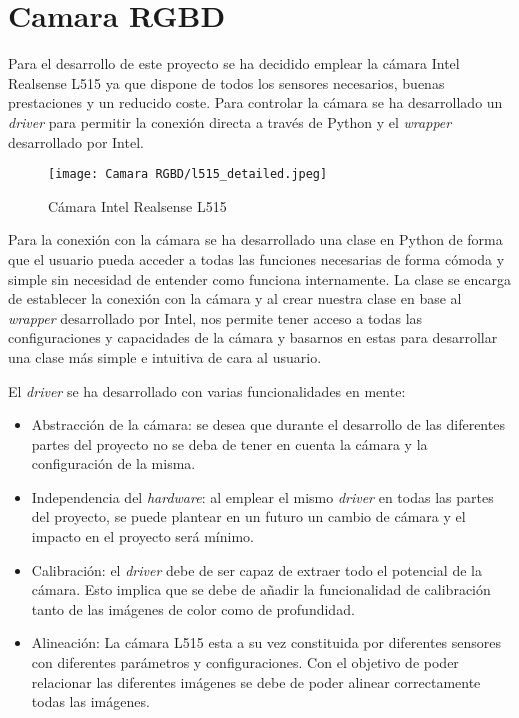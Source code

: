 \chapter{Camara RGBD}
\label{chap:Camara RGBD}
Para el desarrollo de este proyecto se ha decidido emplear la cámara Intel Realsense L515 \citep{IntelL515} ya que dispone de todos los sensores necesarios, buenas prestaciones y un reducido coste. Para controlar la cámara se ha desarrollado un \textit{driver} para permitir la conexión directa a través de Python y el \textit{wrapper} desarrollado por Intel.

\begin{figure}[ht]
	\centering
	\texttt{[image: Camara RGBD/l515\_detailed.jpeg]}
	\caption[Cámara Intel Realsense L515]{Cámara Intel Realsense L515 \citep{IntelL515}}
	\label{chap:Camara RGBD fig:camara}
\end{figure}

Para la conexión con la cámara se ha desarrollado una clase en Python de forma que el usuario pueda acceder a todas las funciones necesarias de forma cómoda y simple sin necesidad de entender como funciona internamente. La clase se encarga de establecer la conexión con la cámara y al crear nuestra clase en base al \textit{wrapper} desarrollado por Intel, nos permite tener acceso a todas las configuraciones y capacidades de la cámara y basarnos en estas para desarrollar una clase más simple e intuitiva de cara al usuario.

El \textit{driver} se ha desarrollado con varias funcionalidades en mente:
\begin{itemize}
\item Abstracción de la cámara: se desea que durante el desarrollo de las diferentes partes del proyecto no se deba de tener en cuenta la cámara y la configuración de la misma.
\item Independencia del \textit{hardware}: al emplear el mismo \textit{driver} en todas las partes del proyecto, se puede plantear en un futuro un cambio de cámara y el impacto en el proyecto será mínimo.
\item Calibración: el \textit{driver} debe de ser capaz de extraer todo el potencial de la cámara. Esto implica que se debe de añadir la funcionalidad de calibración tanto de las imágenes de color como de profundidad.
\item Alineación: La cámara L515 esta a su vez constituida por diferentes sensores con diferentes parámetros y configuraciones. Con el objetivo de poder relacionar las diferentes imágenes se debe de poder alinear correctamente todas las imágenes.
\end{itemize}

